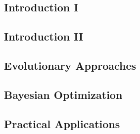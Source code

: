 \subsection{Introduction I}


\subsection{Introduction II}


\subsection{Evolutionary Approaches}


\subsection{Bayesian Optimization}


\subsection{Practical Applications}

